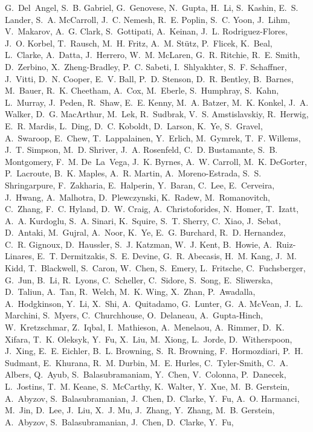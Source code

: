 \documentclass[webpdf,contemporary,large,single]{oup-authoring-template}%
\theoremstyle{thmstyleone}%
\theoremstyle{thmstyletwo}%
\theoremstyle{thmstylethree}%
\begin{document}
\begin{thebibliography}{10}
  G.~Del~Angel, S.~B. Gabriel, G.~Genovese, N.~Gupta, H.~Li, S.~Kashin, E.~S.
  Lander, S.~A. McCarroll, J.~C. Nemesh, R.~E. Poplin, S.~C. Yoon, J.~Lihm,
  V.~Makarov, A.~G. Clark, S.~Gottipati, A.~Keinan, J.~L. Rodriguez-Flores,
  J.~O. Korbel, T.~Rausch, M.~H. Fritz, A.~M. Stütz, P.~Flicek, K.~Beal,
  L.~Clarke, A.~Datta, J.~Herrero, W.~M. McLaren, G.~R. Ritchie, R.~E. Smith,
  D.~Zerbino, X.~Zheng-Bradley, P.~C. Sabeti, I.~Shlyakhter, S.~F. Schaffner,
  J.~Vitti, D.~N. Cooper, E.~V. Ball, P.~D. Stenson, D.~R. Bentley, B.~Barnes,
  M.~Bauer, R.~K. Cheetham, A.~Cox, M.~Eberle, S.~Humphray, S.~Kahn, L.~Murray,
  J.~Peden, R.~Shaw, E.~E. Kenny, M.~A. Batzer, M.~K. Konkel, J.~A. Walker,
  D.~G. MacArthur, M.~Lek, R.~Sudbrak, V.~S. Amstislavskiy, R.~Herwig, E.~R.
  Mardis, L.~Ding, D.~C. Koboldt, D.~Larson, K.~Ye, S.~Gravel, A.~Swaroop,
  E.~Chew, T.~Lappalainen, Y.~Erlich, M.~Gymrek, T.~F. Willems, J.~T. Simpson,
  M.~D. Shriver, J.~A. Rosenfeld, C.~D. Bustamante, S.~B. Montgomery, F.~M.
  De~La~Vega, J.~K. Byrnes, A.~W. Carroll, M.~K. DeGorter, P.~Lacroute, B.~K.
  Maples, A.~R. Martin, A.~Moreno-Estrada, S.~S. Shringarpure, F.~Zakharia,
  E.~Halperin, Y.~Baran, C.~Lee, E.~Cerveira, J.~Hwang, A.~Malhotra,
  D.~Plewczynski, K.~Radew, M.~Romanovitch, C.~Zhang, F.~C. Hyland, D.~W.
  Craig, A.~Christoforides, N.~Homer, T.~Izatt, A.~A. Kurdoglu, S.~A. Sinari,
  K.~Squire, S.~T. Sherry, C.~Xiao, J.~Sebat, D.~Antaki, M.~Gujral, A.~Noor,
  K.~Ye, E.~G. Burchard, R.~D. Hernandez, C.~R. Gignoux, D.~Haussler, S.~J.
  Katzman, W.~J. Kent, B.~Howie, A.~Ruiz-Linares, E.~T. Dermitzakis, S.~E.
  Devine, G.~R. Abecasis, H.~M. Kang, J.~M. Kidd, T.~Blackwell, S.~Caron,
  W.~Chen, S.~Emery, L.~Fritsche, C.~Fuchsberger, G.~Jun, B.~Li, R.~Lyons,
  C.~Scheller, C.~Sidore, S.~Song, E.~Sliwerska, D.~Taliun, A.~Tan, R.~Welch,
  M.~K. Wing, X.~Zhan, P.~Awadalla, A.~Hodgkinson, Y.~Li, X.~Shi, A.~Quitadamo,
  G.~Lunter, G.~A. McVean, J.~L. Marchini, S.~Myers, C.~Churchhouse,
  O.~Delaneau, A.~Gupta-Hinch, W.~Kretzschmar, Z.~Iqbal, I.~Mathieson,
  A.~Menelaou, A.~Rimmer, D.~K. Xifara, T.~K. Oleksyk, Y.~Fu, X.~Liu, M.~Xiong,
  L.~Jorde, D.~Witherspoon, J.~Xing, E.~E. Eichler, B.~L. Browning, S.~R.
  Browning, F.~Hormozdiari, P.~H. Sudmant, E.~Khurana, R.~M. Durbin, M.~E.
  Hurles, C.~Tyler-Smith, C.~A. Albers, Q.~Ayub, S.~Balasubramaniam, Y.~Chen,
  V.~Colonna, P.~Danecek, L.~Jostins, T.~M. Keane, S.~McCarthy, K.~Walter,
  Y.~Xue, M.~B. Gerstein, A.~Abyzov, S.~Balasubramanian, J.~Chen, D.~Clarke,
  Y.~Fu, A.~O. Harmanci, M.~Jin, D.~Lee, J.~Liu, X.~J. Mu, J.~Zhang, Y.~Zhang,
  M.~B. Gerstein, A.~Abyzov, S.~Balasubramanian, J.~Chen, D.~Clarke, Y.~Fu,

\end{thebibliography}
\end{document}
